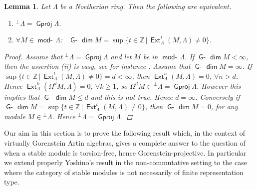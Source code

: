\documentclass[oneside, a4paper,reqno]{amsart}
\numberwithin{equation}{section}
\newtheorem{lem}[thm]{Lemma}
\theoremstyle{definition}
\begin{document}
\begin{lem} Let $\Lambda$ be a Noetherian  ring. Then the following
are equivalent.
\begin{enumerate}
\item ${^{\bot}}\Lambda = {\operatorname{\mathsf{Gproj}}\nolimits}\Lambda$.
\item $\forall M \in \operatorname*{\mathsf{mod}-\!}\Lambda$: \ $\operatorname*{\mathsf{G}-\!}\operatorname*{\mathsf{dim}} M = \sup\{t \in \mathbb Z \, | \, \operatorname*{\mathsf{Ext}}^{t}_{\Lambda}(M,\Lambda) \neq
0\}$.
\end{enumerate}
\begin{proof} Assume that ${^{\bot}}\Lambda =
{\operatorname{\mathsf{Gproj}}\nolimits}\Lambda$ and let $M$ be in $\operatorname*{\mathsf{mod}-\!}\Lambda$. If $\operatorname*{\mathsf{G}-\!}\operatorname*{\mathsf{dim}} M
<\infty$, then the assertion (ii) is easy, see for instance
\cite[Proposition 3.9]{B:cm}. Assume that $\operatorname*{\mathsf{G}-\!}\operatorname*{\mathsf{dim}} M = \infty$. If
$\sup\{t \in \mathbb Z\, | \, \operatorname*{\mathsf{Ext}}^{t}_{\Lambda}(M,\Lambda) \neq 0\}
= d < \infty$, then $\operatorname*{\mathsf{Ext}}^{n}_{\Lambda}(M,\Lambda) = 0$, $\forall n
> d$. Hence $\operatorname*{\mathsf{Ext}}^{k}_{\Lambda}(\Omega^{d}M,\Lambda) = 0$, $\forall
k \geq 1$, so $\Omega^{d}M \in {^{\bot}}\Lambda = {\operatorname{\mathsf{Gproj}}\nolimits}\Lambda$.
However this implies that $\operatorname*{\mathsf{G}-\!}\operatorname*{\mathsf{dim}} M \leq d$ and this is not true.
Hence $d = \infty$. Conversely if $\operatorname*{\mathsf{G}-\!}\operatorname*{\mathsf{dim}} M = \sup\{t \in \mathbb
Z\, | \, \operatorname*{\mathsf{Ext}}^{t}_{\Lambda}(M,\Lambda) \neq 0\}$, then $\operatorname*{\mathsf{G}-\!}\operatorname*{\mathsf{dim}} M
= 0$, for any module $M \in {^{\bot}}\Lambda$. Hence
${^{\bot}}\Lambda = {\operatorname{\mathsf{Gproj}}\nolimits}\Lambda$.
\end{proof}
\end{lem}

 Our aim in this section is
to prove the following result which, in the context of virtually
Gorenstein  Artin algebras, gives a complete answer to the question
of when a stable module is torsion-free, hence
Gorenstein-projective. In particular we extend properly Yoshino's
result in the non-commutative setting to the case where the category
of stable modules is not necessarily of finite representation type.
\end{document}
